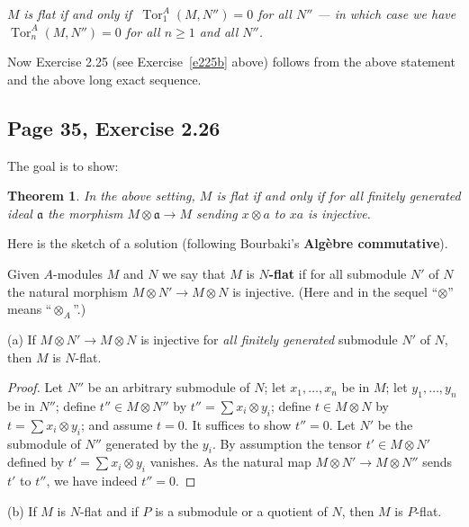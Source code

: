 \documentclass[parskip=half,fontsize=12pt]{scrartcl}%
\newcommand{\mf}{\mathfrak}
\newcommand{\aaa}{\mf a}
\newcommand{\Tor}{\operatorname{Tor}}
\newtheorem{thm}{Theorem}%
\begin{document}
$M$ \emph{is flat if and only if $\ \Tor^A_1(M,N'')=0$ for all $N''$ --- in which case we have $\Tor^A_n(M,N'')=0$ for all $n\ge1$ and all $N''$.}

Now Exercise 2.25 (see Exercise~\ref{e225b} above) follows from the above statement and the above long exact sequence.

\subsection{Page 35, Exercise 2.26}\label{35}%

The goal is to show: 



\begin{thm}\label{flatcrit}
In the above setting, $M$ is flat if and only if for all finitely generated ideal $\aaa$ the morphism $M\otimes\aaa\to M$ sending $x\otimes a$ to $xa$ is injective.
\end{thm}

Here is the sketch of a solution (following Bourbaki's \textbf{Algèbre commutative}).

Given $A$-modules $M$ and $N$ we say that $M$ is $N$\textbf{-flat} if for all submodule $N'$ of $N$ the natural morphism $M\otimes N'\to M\otimes N$ is injective. (Here and in the sequel ``$\otimes$'' means ``$\otimes_A$''.) 

(a) If $M\otimes N'\to M\otimes N$ is injective for \emph{all finitely generated} submodule $N'$ of $N$, then $M$ is $N$-flat.

\begin{proof} 
Let $N''$ be an arbitrary submodule of $N$; let $x_1,\dots,x_n$ be in $M$; let $y_1,\dots,y_n$ be in $N''$; define $t''\in M\otimes N''$ by $t''=\sum x_i\otimes y_i$; define $t\in M\otimes N$ by $t=\sum x_i\otimes y_i$; and assume $t=0$. It suffices to show $t''=0$. Let $N'$ be the submodule of $N''$ generated by the $y_i$. By assumption the tensor $t'\in M\otimes N'$ defined by $t'=\sum x_i\otimes y_i$ vanishes. As the natural map $M\otimes N'\to M\otimes N''$ sends $t'$ to $t''$, we have indeed $t''=0$. 
\end{proof}

(b) If $M$ is $N$-flat and if $P$ is a submodule or a quotient of $N$, then $M$ is $P$-flat.%
\end{document}
